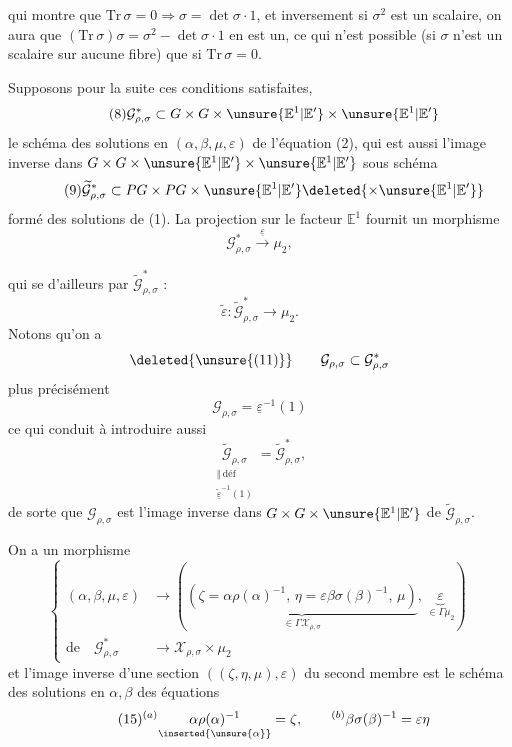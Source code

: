 
qui montre que $\mathrm{Tr}\,\sigma=0\Longrightarrow\sigma=\det\sigma\cdot1$,
et inversement si $\sigma^2$ est un scalaire, on aura que
$(\mathrm{Tr}\,\sigma)\sigma=\sigma^2-\det\sigma\cdot1$ en est un,
ce qui n'est possible (si $\sigma$ n'est  un scalaire sur aucune
fibre) que si $\mathrm{Tr}\,\sigma=0$.

Supposons pour la suite ces conditions satisfaites,
\[
\tag{8}
\mathcal G^*_{\rho,\sigma}\subset
G\times G\times\unsure{\mathbb E^1|\mathbb E'}
\times\unsure{\mathbb E^1|\mathbb E'}
\]
le schéma des solutions en $(\alpha,\beta,\mu,\varepsilon)$ de l'équation (2),
qui est aussi l'image inverse dans
$G\times G\times\unsure{\mathbb E^1|\mathbb E'}
\times\unsure{\mathbb E^1|\mathbb E'}$  sous schéma
\[
\tag{9}
\widetilde{\mathcal G}^*_{\rho,\sigma}\subset
PG\times PG\times\unsure{\mathbb E^1|\mathbb E'}
\deleted{\times\unsure{\mathbb E^1|\mathbb E'}}
\]
formé des solutions \inserted{$(\alpha,\beta,\mu)$} de (1).
La projection sur le  facteur
$\mathbb E^1$ fournit un morphisme
\[
\tag{10}
\mathcal G^*_{\rho,\sigma}\xrightarrow{\underline{\varepsilon}}\mu_2,
\]

qui se  d'ailleurs par $\widetilde{\mathcal G}^{*}_{\rho,\sigma}$ :
\[
\tag{11}
\widetilde{\varepsilon}:\widetilde{\mathcal G}^{*}_{\rho,\sigma}\longrightarrow\mu_2.
\]
Notons qu'on a
\[
\deleted{\unsure{(11)}}\qquad
\mathcal G_{\rho,\sigma}\subset\mathcal G^{*}_{\rho,\sigma}
\]
plus précisément
\[
\tag{12}
\mathcal G_{\rho,\sigma}=\underline{\varepsilon}^{-1}(1)
\]
ce qui conduit à introduire aussi
\[
\tag{13}
\underset{\substack{\Vert\ \text{déf}\\
\underline{\widetilde{\varepsilon}}^{-1}(1)}}{\widetilde{\mathcal G}_{\rho,\sigma}}
=\widetilde{\mathcal G}^{*}_{\rho,\sigma},
\]
de sorte que $\mathcal G_{\rho,\sigma}$ est l'image inverse dans
$G\times G\times\unsure{\mathbb E^1|\mathbb E'}$ de $\widetilde{\mathcal G}_{\rho,\sigma}$.

On a un morphisme
\[
\tag{14}
\left\{\begin{aligned}
(\alpha,\beta,\mu,\varepsilon)&\longrightarrow
\left(\underbrace{(\zeta=\alpha\rho(\alpha)^{-1},\,
\eta=\varepsilon\beta\sigma(\beta)^{-1},\,\mu)}_{\in\Gamma\mathcal X_{\rho,\sigma}},\,
\underbrace{\varepsilon}_{\in\Gamma\mu_2}\right)\\
\text{de}\quad\mathcal G^{*}_{\rho,\sigma}&\longrightarrow\mathcal X_{\rho,\sigma}\times\mu_2
\end{aligned}\right.
\]
et l'image inverse d'une section $((\zeta,\eta,\mu),\varepsilon)$ du second membre est le
schéma des solutions en $\alpha,\beta$ des équations
\[
\tag{15}
{}^{(a)}\underset{\inserted{\unsure{\alpha}}}{\alpha\rho(\alpha)^{-1}}=\zeta,
\qquad {}^{(b)}\beta\sigma(\beta)^{-1}=\varepsilon\eta
\]

